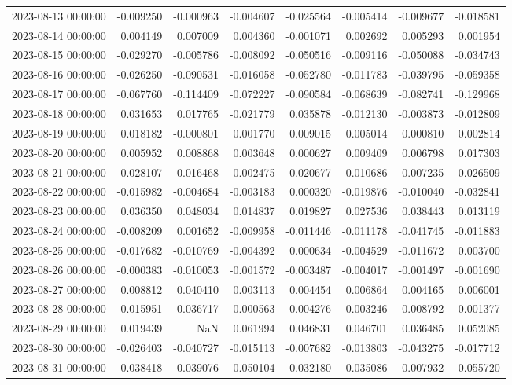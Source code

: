 \begin{tabular}{lrrrrrrr}
2023-08-13 00:00:00 & -0.009250 & -0.000963 & -0.004607 & -0.025564 & -0.005414 & -0.009677 & -0.018581 \\
2023-08-14 00:00:00 & 0.004149 & 0.007009 & 0.004360 & -0.001071 & 0.002692 & 0.005293 & 0.001954 \\
2023-08-15 00:00:00 & -0.029270 & -0.005786 & -0.008092 & -0.050516 & -0.009116 & -0.050088 & -0.034743 \\
2023-08-16 00:00:00 & -0.026250 & -0.090531 & -0.016058 & -0.052780 & -0.011783 & -0.039795 & -0.059358 \\
2023-08-17 00:00:00 & -0.067760 & -0.114409 & -0.072227 & -0.090584 & -0.068639 & -0.082741 & -0.129968 \\
2023-08-18 00:00:00 & 0.031653 & 0.017765 & -0.021779 & 0.035878 & -0.012130 & -0.003873 & -0.012809 \\
2023-08-19 00:00:00 & 0.018182 & -0.000801 & 0.001770 & 0.009015 & 0.005014 & 0.000810 & 0.002814 \\
2023-08-20 00:00:00 & 0.005952 & 0.008868 & 0.003648 & 0.000627 & 0.009409 & 0.006798 & 0.017303 \\
2023-08-21 00:00:00 & -0.028107 & -0.016468 & -0.002475 & -0.020677 & -0.010686 & -0.007235 & 0.026509 \\
2023-08-22 00:00:00 & -0.015982 & -0.004684 & -0.003183 & 0.000320 & -0.019876 & -0.010040 & -0.032841 \\
2023-08-23 00:00:00 & 0.036350 & 0.048034 & 0.014837 & 0.019827 & 0.027536 & 0.038443 & 0.013119 \\
2023-08-24 00:00:00 & -0.008209 & 0.001652 & -0.009958 & -0.011446 & -0.011178 & -0.041745 & -0.011883 \\
2023-08-25 00:00:00 & -0.017682 & -0.010769 & -0.004392 & 0.000634 & -0.004529 & -0.011672 & 0.003700 \\
2023-08-26 00:00:00 & -0.000383 & -0.010053 & -0.001572 & -0.003487 & -0.004017 & -0.001497 & -0.001690 \\
2023-08-27 00:00:00 & 0.008812 & 0.040410 & 0.003113 & 0.004454 & 0.006864 & 0.004165 & 0.006001 \\
2023-08-28 00:00:00 & 0.015951 & -0.036717 & 0.000563 & 0.004276 & -0.003246 & -0.008792 & 0.001377 \\
2023-08-29 00:00:00 & 0.019439 & NaN & 0.061994 & 0.046831 & 0.046701 & 0.036485 & 0.052085 \\
2023-08-30 00:00:00 & -0.026403 & -0.040727 & -0.015113 & -0.007682 & -0.013803 & -0.043275 & -0.017712 \\
2023-08-31 00:00:00 & -0.038418 & -0.039076 & -0.050104 & -0.032180 & -0.035086 & -0.007932 & -0.055720 \\

\end{tabular}
